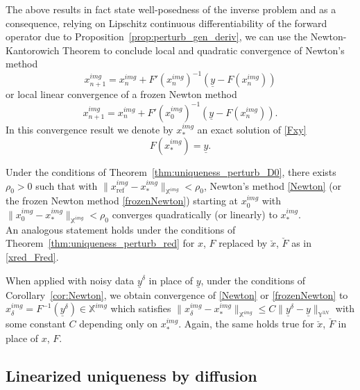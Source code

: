 \documentclass{ws-m3as}
\newcommand\xred{\check{x}}
\newcommand\Fred{\check{F}}
\begin{document}
The above results in fact state well-posedness of the inverse problem and as a consequence, relying on Lipschitz continuous differentiability of the forward operator due to Proposition~\ref{prop:perturb_gen_deriv}, we can use the Newton-Kantorowich Theorem to conclude local and quadratic convergence of Newton's method
\begin{equation}\label{Newton}
x^{img}_{n+1}=x^{img}_n+F'(x^{img}_n)^{-1}(\underline{y}-F(x^{img}_n))
\end{equation} 
or local linear convergence of a frozen Newton method
\begin{equation}\label{frozenNewton}
x^{img}_{n+1}=x^{img}_n+F'(x^{img}_0)^{-1}(\underline{y}-F(x^{img}_n)).
\end{equation} 
In this convergence result we denote by $x^{img}_*$ an exact solution of \eqref{Fxy}
\begin{equation}\label{xstar}
F(x^{img}_*)=\underline{y}.
\end{equation}

\begin{corollary}\label{cor:Newton}
Under the conditions of Theorem~\ref{thm:uniqueness_perturb_D0}, there exists $\rho_0>0$ such that with $\|x^{img}_{\text{ref}}-x^{img}_*\|_{\mathbb{X}^{img}}<\rho_0$, Newton's method \eqref{Newton} (or the frozen Newton method \eqref{frozenNewton}) starting at $x^{img}_0$ with $\|x^{img}_0-x^{img}_*\|_{\mathbb{X}^{img}}<\rho_0$ converges quadratically (or linearly) to $x^{img}_*$.\\
An analogous statement holds under the conditions of Theorem~\ref{thm:uniqueness_perturb_red} for $x$, $F$ replaced by $\xred$, $\Fred$ as in \eqref{xred_Fred}.
\end{corollary}
\begin{remark}\label{rem:noise}
When applied with noisy data $\underline{y}^\delta$ in place of $\underline{y}$, under the conditions of Corollary~\ref{cor:Newton}, we obtain convergence of \eqref{Newton} or \eqref{frozenNewton} to  $x^{img}_\delta=F^{-1}(\underline{y}^\delta)\in\mathbb{X}^{img}$ which satisfies $\|x^{img}_\delta-x^{img}_*\|_{\mathbb{X}^{img}}\leq C\|\underline{y}^\delta-\underline{y}\|_{\mathbb{Y}^{3N}}$ with some constant $C$ depending only on $x^{img}_*$.
Again, the same holds true for $\xred$, $\Fred$ in place of $x$, $F$.
\end{remark}

\subsection{Linearized uniqueness by diffusion}\label{sec:uniqueness_diffusion}
\end{document}
